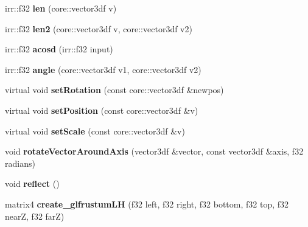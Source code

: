 \begin{DoxyCompactItemize}
\item 
\hypertarget{classc_mirror_aca5bedd805fedde16fb6836b25e9a269}{
irr::f32 {\bfseries len} (core::vector3df v)}
\label{classc_mirror_aca5bedd805fedde16fb6836b25e9a269}

\item 
\hypertarget{classc_mirror_a060e2a2fa6dace88614a8f3113d641df}{
irr::f32 {\bfseries len2} (core::vector3df v, core::vector3df v2)}
\label{classc_mirror_a060e2a2fa6dace88614a8f3113d641df}

\item 
\hypertarget{classc_mirror_a0069592d70a1cd830b8fc449162c6873}{
irr::f32 {\bfseries acosd} (irr::f32 input)}
\label{classc_mirror_a0069592d70a1cd830b8fc449162c6873}

\item 
\hypertarget{classc_mirror_afd1521509126d913be9614dc0e0798de}{
irr::f32 {\bfseries angle} (core::vector3df v1, core::vector3df v2)}
\label{classc_mirror_afd1521509126d913be9614dc0e0798de}

\item 
\hypertarget{classc_mirror_aab6d1a6d01efedce314c7fbfdaa581d2}{
virtual void {\bfseries setRotation} (const core::vector3df \&newpos)}
\label{classc_mirror_aab6d1a6d01efedce314c7fbfdaa581d2}

\item 
\hypertarget{classc_mirror_a8de170a842465fad2f9d1b179bc4c9fe}{
virtual void {\bfseries setPosition} (const core::vector3df \&v)}
\label{classc_mirror_a8de170a842465fad2f9d1b179bc4c9fe}

\item 
\hypertarget{classc_mirror_a23836a2155442d09cd89a37a4ac7b6ec}{
virtual void {\bfseries setScale} (const core::vector3df \&v)}
\label{classc_mirror_a23836a2155442d09cd89a37a4ac7b6ec}

\item 
\hypertarget{classc_mirror_ae9786336320bcbd98d99b46974558032}{
void {\bfseries rotateVectorAroundAxis} (vector3df \&vector, const vector3df \&axis, f32 radians)}
\label{classc_mirror_ae9786336320bcbd98d99b46974558032}

\item 
\hypertarget{classc_mirror_a935bb5e379ab76a06363584ef1e5dfd7}{
void {\bfseries reflect} ()}
\label{classc_mirror_a935bb5e379ab76a06363584ef1e5dfd7}

\item 
\hypertarget{classc_mirror_ad80f956b90b7742a7f2151702b254497}{
matrix4 {\bfseries create\_\-glfrustumLH} (f32 left, f32 right, f32 bottom, f32 top, f32 nearZ, f32 farZ)}
\label{classc_mirror_ad80f956b90b7742a7f2151702b254497}

\end{DoxyCompactItemize}
